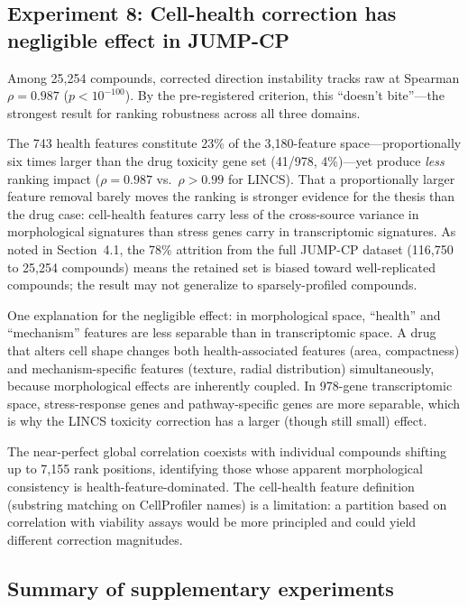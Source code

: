 \documentclass[11pt]{article}
\begin{document}
\subsection{Experiment 8: Cell-health correction has negligible
effect in JUMP-CP}

Among 25{,}254 compounds, corrected direction instability tracks raw
at Spearman $\rho = 0.987$ ($p < 10^{-100}$). By the pre-registered
criterion, this ``doesn't bite''---the strongest result for ranking
robustness across all three domains.

The 743 health features constitute 23\% of the 3{,}180-feature
space---proportionally six times larger than the drug toxicity gene set
(41/978, 4\%)---yet produce \emph{less} ranking impact ($\rho = 0.987$
vs.\ $\rho > 0.99$ for LINCS). That a proportionally larger feature
removal barely moves the ranking is stronger evidence for the thesis than
the drug case: cell-health features carry less of the cross-source
variance in morphological signatures than stress genes carry in
transcriptomic signatures. As noted in Section~4.1, the 78\% attrition
from the full JUMP-CP dataset (116{,}750 to 25{,}254 compounds) means
the retained set is biased toward well-replicated compounds; the result
may not generalize to sparsely-profiled compounds.

One explanation for the negligible effect: in morphological space,
``health'' and ``mechanism'' features are less separable than in
transcriptomic space. A drug that alters cell shape changes both
health-associated features (area, compactness) and mechanism-specific
features (texture, radial distribution) simultaneously, because
morphological effects are inherently coupled. In 978-gene transcriptomic
space, stress-response genes and pathway-specific genes are more
separable, which is why the LINCS toxicity correction has a larger
(though still small) effect.

The near-perfect global correlation coexists with individual compounds
shifting up to 7{,}155 rank positions, identifying those whose apparent
morphological consistency is health-feature-dominated. The cell-health feature
definition (substring matching on CellProfiler names) is a limitation:
a partition based on correlation with viability assays would be more
principled and could yield different correction magnitudes.

\subsection{Summary of supplementary experiments}
\end{document}
